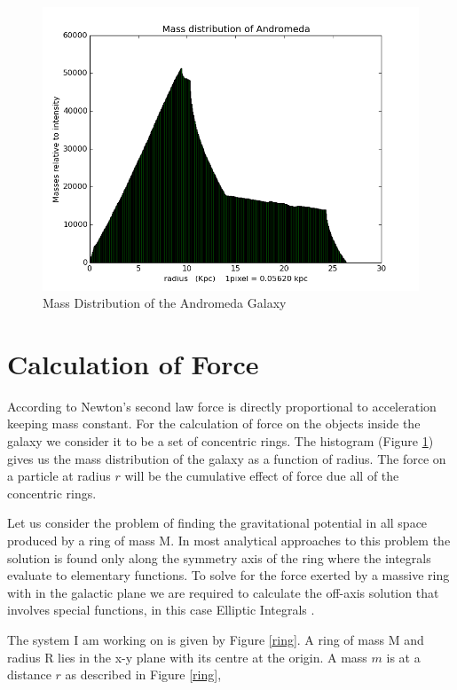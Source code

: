 \begin{enumerate}
\begin{figure}[ht]
   \centering
   \includegraphics[scale=0.45]{400}
   \caption{Mass Distribution of the Andromeda Galaxy}
   \label{histogram}
\end{figure}

\end{enumerate}

\section{Calculation of Force}

According to Newton's second law force is directly proportional to acceleration keeping mass constant. For the calculation of force on the objects inside the galaxy we consider it to be a set of concentric rings. The histogram (Figure \ref{histogram}) gives us the mass distribution of the galaxy as a function of radius. The force on a particle at radius $r$ will be the cumulative effect of force due all of the concentric rings.

Let us consider the problem of finding the gravitational potential in all space produced by a ring of mass M. In most analytical approaches to this problem the solution is found only along the symmetry axis of the ring where the integrals evaluate to elementary functions. To solve for the force exerted by a massive ring with in the galactic plane we are required to calculate the off-axis solution that involves special functions, in this case Elliptic Integrals \cite{paper}.
 
The system I am working on is given by Figure \ref{ring}. A ring of mass M and radius R lies in the x-y plane with its centre at the origin. A mass $m$ is at a distance $r$ as described in Figure \ref{ring}, 

